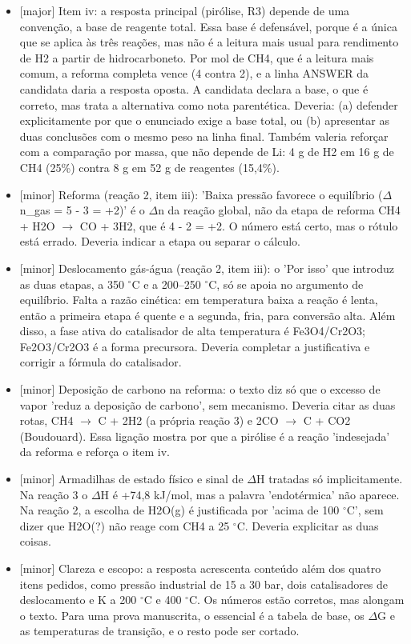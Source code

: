 \documentclass{article}%
\begin{document}
\begin{itemize}%
\item%
{[}major{]} Item iv: a resposta principal (pirólise, R3) depende de uma convenção, a base de reagente total. Essa base é defensável, porque é a única que se aplica às três reações, mas não é a leitura mais usual para rendimento de H2 a partir de hidrocarboneto. Por mol de CH4, que é a leitura mais comum, a reforma completa vence (4 contra 2), e a linha ANSWER da candidata daria a resposta oposta. A candidata declara a base, o que é correto, mas trata a alternativa como nota parentética. Deveria: (a) defender explicitamente por que o enunciado exige a base total, ou (b) apresentar as duas conclusões com o mesmo peso na linha final. Também valeria reforçar com a comparação por massa, que não depende de Li: 4 g de H2 em 16 g de CH4 (25\%) contra 8 g em 52 g de reagentes (15,4\%).%
\item%
{[}minor{]} Reforma (reação 2, item iii): 'Baixa pressão favorece o equilíbrio ($\Delta$n\_gas = 5 - 3 = +2)' é o $\Delta$n da reação global, não da etapa de reforma CH4 + H2O $\to$ CO + 3H2, que é 4 - 2 = +2. O número está certo, mas o rótulo está errado. Deveria indicar a etapa ou separar o cálculo.%
\item%
{[}minor{]} Deslocamento gás{-}água (reação 2, item iii): o 'Por isso' que introduz as duas etapas, a 350 $^\circ$C e a 200--250 $^\circ$C, só se apoia no argumento de equilíbrio. Falta a razão cinética: em temperatura baixa a reação é lenta, então a primeira etapa é quente e a segunda, fria, para conversão alta. Além disso, a fase ativa do catalisador de alta temperatura é Fe3O4/Cr2O3; Fe2O3/Cr2O3 é a forma precursora. Deveria completar a justificativa e corrigir a fórmula do catalisador.%
\item%
{[}minor{]} Deposição de carbono na reforma: o texto diz só que o excesso de vapor 'reduz a deposição de carbono', sem mecanismo. Deveria citar as duas rotas, CH4 $\to$ C + 2H2 (a própria reação 3) e 2CO $\to$ C + CO2 (Boudouard). Essa ligação mostra por que a pirólise é a reação 'indesejada' da reforma e reforça o item iv.%
\item%
{[}minor{]} Armadilhas de estado físico e sinal de $\Delta$H tratadas só implicitamente. Na reação 3 o $\Delta$H é +74,8 kJ/mol, mas a palavra 'endotérmica' não aparece. Na reação 2, a escolha de H2O(g) é justificada por 'acima de 100 $^\circ$C', sem dizer que H2O(?) não reage com CH4 a 25 $^\circ$C. Deveria explicitar as duas coisas.%
\item%
{[}minor{]} Clareza e escopo: a resposta acrescenta conteúdo além dos quatro itens pedidos, como pressão industrial de 15 a 30 bar, dois catalisadores de deslocamento e K a 200 $^\circ$C e 400 $^\circ$C. Os números estão corretos, mas alongam o texto. Para uma prova manuscrita, o essencial é a tabela de base, os $\Delta$G e as temperaturas de transição, e o resto pode ser cortado.%
\end{itemize}%
\end{document}
